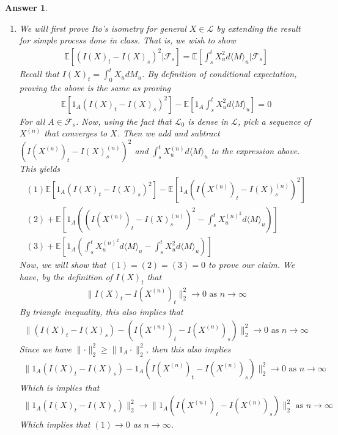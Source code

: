 \documentclass[12pt]{article}
\theoremstyle{colon}
\newtheorem*{answer}{Answer}
\begin{document}
\begin{answer}
  \leavevmode
  \begin{enumerate}[label=\alph*)]
    \item We will first prove Ito's isometry for general $X \in \mathcal{L}$ by extending the result for simple process done in class. That is, we wish to show
      \begin{gather*}
        \mathbb{E}[(I(X)_t - I(X)_s)^2 | \mathcal{F}_s] = \mathbb{E}[\int_s^t X_u^2 d \langle M \rangle_u | \mathcal{F}_s]
      \end{gather*}
      Recall that $I(X)_t = \int_0^t X_u d M_u$. By definition of conditional expectation, proving the above is the same as proving
      \begin{gather*}
        \mathbb{E}[1_{A}(I(X)_t - I(X)_s)^2] - \mathbb{E}[1_{A} \int_s^t X_u^2 d \langle M \rangle_u] = 0
      \end{gather*}
      For all $A \in \mathcal{F}_s$. Now, using the fact that $\mathcal{L}_0$ is dense in $\mathcal{L}$, pick a sequence of $X^{(n)}$ that converges to $X$. Then we add and subtract $(I(X^{(n)})_t - I(X)_s^{(n)})^2$ and $\int_s^t X_u^{(n)} d \langle M \rangle_u$ to the expression above. This yields
      \begin{gather*}
        (1) \mathbb{E}[1_{A}(I(X)_t - I(X)_s)^2] - \mathbb{E}[1_{A}(I(X^{(n)})_t - I(X)_s^{(n)})^2] \\
        (2) + \mathbb{E}[1_{A} \left( (I(X^{(n)})_t - I(X)_s^{(n)})^2 - \int_s^t X_u^{(n)^2} d \langle M \rangle_u \right)] \\
        (3) + \mathbb{E}[1_{A} \left( \int_s^t X_u^{(n)^2} d \langle M \rangle_u - \int_s^t X_u^2 d \langle M \rangle_u \right)]
      \end{gather*}
      Now, we will show that $(1) = (2) = (3) = 0$ to prove our claim. We have, by the definition of $I(X)_t$ that
      \begin{gather*}
        \lVert I(X)_t - I(X^{(n)})_t \rVert_2^2 \rightarrow 0 \text{ as } n \rightarrow \infty
      \end{gather*}
      By triangle inequality, this also implies that
      \begin{gather*}
        \lVert (I(X)_t - I(X)_s) - (I(X^{(n)})_t - I(X^{(n)})_s) \rVert_2^2 \rightarrow 0 \text{ as } n \rightarrow \infty
      \end{gather*}
      Since we have $\lVert \cdot \rVert_2^2 \geq \lVert 1_A \cdot \rVert_2^2$, then this also implies
      \begin{gather*}
        \lVert 1_A (I(X)_t - I(X)_s) - 1_A(I(X^{(n)})_t - I(X^{(n)})_s) \rVert_2^2 \rightarrow 0 \text{ as } n \rightarrow \infty
      \end{gather*}
      Which is implies that
      \begin{gather*}
        \lVert 1_A (I(X)_t - I(X)_s) \rVert_2^2 \rightarrow \lVert 1_A(I(X^{(n)})_t - I(X^{(n)})_s) \rVert_2^2 \text{ as } n \rightarrow \infty
      \end{gather*}
      Which implies that $(1) \rightarrow 0$ as $n \rightarrow \infty$.


\end{enumerate}
\end{answer}
\end{document}
